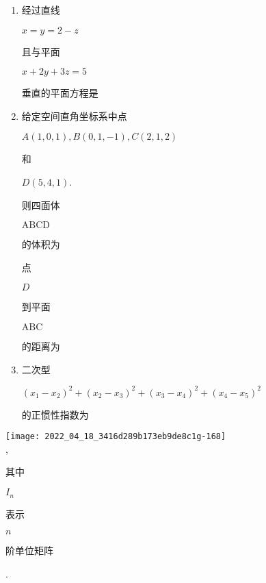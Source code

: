 \documentclass[10pt]{article}
\begin{document}
\begin{enumerate}
  \item \begin{CJK}{UTF8}{mj}经过直线\end{CJK} $x=y=2-z$ \begin{CJK}{UTF8}{mj}且与平面\end{CJK} $x+2 y+3 z=5$ \begin{CJK}{UTF8}{mj}垂直的平面方程是\end{CJK}

  \item \begin{CJK}{UTF8}{mj}给定空间直角坐标系中点\end{CJK} $A(1,0,1), B(0,1,-1), C(2,1,2)$ \begin{CJK}{UTF8}{mj}和\end{CJK} $D(5,4,1)$. \begin{CJK}{UTF8}{mj}则四面体\end{CJK} $\mathrm{ABCD}$ \begin{CJK}{UTF8}{mj}的体积为\end{CJK} \begin{CJK}{UTF8}{mj}点\end{CJK} $D$ \begin{CJK}{UTF8}{mj}到平面\end{CJK} $\mathrm{ABC}$ \begin{CJK}{UTF8}{mj}的距离为\end{CJK}

  \item \begin{CJK}{UTF8}{mj}二次型\end{CJK} $\left(x_{1}-x_{2}\right)^{2}+\left(x_{2}-x_{3}\right)^{2}+\left(x_{3}-x_{4}\right)^{2}+\left(x_{4}-x_{5}\right)^{2}$ \begin{CJK}{UTF8}{mj}的正惯性指数为\end{CJK}

\end{enumerate}
\texttt{[image: 2022\_04\_18\_3416d289b173eb9de8c1g-168]}\\
, \begin{CJK}{UTF8}{mj}其中\end{CJK} $I_{n}$ \begin{CJK}{UTF8}{mj}表示\end{CJK} $n$ \begin{CJK}{UTF8}{mj}阶单位矩阵\end{CJK}.
\end{document}

